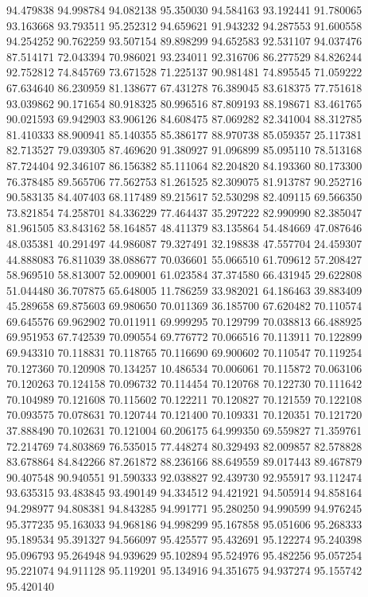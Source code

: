 94.479838
94.998784
94.082138
95.350030
94.584163
93.192441
91.780065
93.163668
93.793511
95.252312
94.659621
91.943232
94.287553
91.600558
94.254252
90.762259
93.507154
89.898299
94.652583
92.531107
94.037476
87.514171
72.043394
70.986021
93.234011
92.316706
86.277529
84.826244
92.752812
74.845769
73.671528
71.225137
90.981481
74.895545
71.059222
67.634640
86.230959
81.138677
67.431278
76.389045
83.618375
77.751618
93.039862
90.171654
80.918325
80.996516
87.809193
88.198671
83.461765
90.021593
69.942903
83.906126
84.608475
87.069282
82.341004
88.312785
81.410333
88.900941
85.140355
85.386177
88.970738
85.059357
25.117381
82.713527
79.039305
87.469620
91.380927
91.096899
85.095110
78.513168
87.724404
92.346107
86.156382
85.111064
82.204820
84.193360
80.173300
76.378485
89.565706
77.562753
81.261525
82.309075
81.913787
90.252716
90.583135
84.407403
68.117489
89.215617
52.530298
82.409115
69.566350
73.821854
74.258701
84.336229
77.464437
35.297222
82.990990
82.385047
81.961505
83.843162
58.164857
48.411379
83.135864
54.484669
47.087646
48.035381
40.291497
44.986087
79.327491
32.198838
47.557704
24.459307
44.888083
76.811039
38.088677
70.036601
55.066510
61.709612
57.208427
58.969510
58.813007
52.009001
61.023584
37.374580
66.431945
29.622808
51.044480
36.707875
65.648005
11.786259
33.982021
64.186463
39.883409
45.289658
69.875603
69.980650
70.011369
36.185700
67.620482
70.110574
69.645576
69.962902
70.011911
69.999295
70.129799
70.038813
66.488925
69.951953
67.742539
70.090554
69.776772
70.066516
70.113911
70.122899
69.943310
70.118831
70.118765
70.116690
69.900602
70.110547
70.119254
70.127360
70.120908
70.134257
10.486534
70.006061
70.115872
70.063106
70.120263
70.124158
70.096732
70.114454
70.120768
70.122730
70.111642
70.104989
70.121608
70.115602
70.122211
70.120827
70.121559
70.122108
70.093575
70.078631
70.120744
70.121400
70.109331
70.120351
70.121720
37.888490
70.102631
70.121004
60.206175
64.999350
69.559827
71.359761
72.214769
74.803869
76.535015
77.448274
80.329493
82.009857
82.578828
83.678864
84.842266
87.261872
88.236166
88.649559
89.017443
89.467879
90.407548
90.940551
91.590333
92.038827
92.439730
92.955917
93.112474
93.635315
93.483845
93.490149
94.334512
94.421921
94.505914
94.858164
94.298977
94.808381
94.843285
94.991771
95.280250
94.990599
94.976245
95.377235
95.163033
94.968186
94.998299
95.167858
95.051606
95.268333
95.189534
95.391327
94.566097
95.425577
95.432691
95.122274
95.240398
95.096793
95.264948
94.939629
95.102894
95.524976
95.482256
95.057254
95.221074
94.911128
95.119201
95.134916
94.351675
94.937274
95.155742
95.420140

